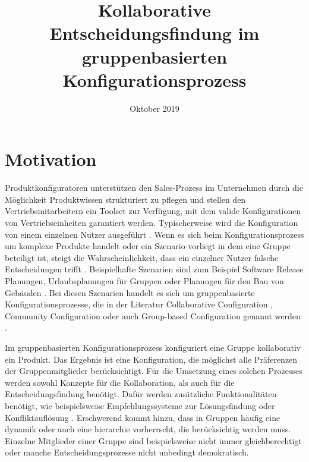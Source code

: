 \documentclass[12pt]{article}
\title{Kollaborative Entscheidungsfindung im gruppenbasierten Konfigurationsprozess}
\date{Oktober 2019}
\begin{document}
\maketitle

\section{Motivation}

Produktkonfiguratoren unterstützen den Sales-Prozess im Unternehmen durch die Möglichkeit Produktwissen strukturiert zu pflegen und stellen den Vertriebsmitarbeitern ein Toolset zur Verfügung, mit dem valide Konfigurationen von Vertriebseinheiten garantiert werden. Typischerweise wird die Konfiguration von einem einzelnen Nutzer ausgeführt \cite{felferningGroupBasedConfiguration2016, velasquez-guevaraMultiSPLOTSupportingMultiuser2018a}.
Wenn es sich beim Konfigurationsprozess um komplexe Produkte handelt oder ein Szenario vorliegt in dem eine Gruppe beteiligt ist, steigt die Wahrscheinlichkeit, dass ein einzelner Nutzer falsche Entscheidungen trifft \cite{felfernigGroupDecisionSupport2011}. 
Beispielhafte Szenarien sind zum Beispiel Software Release Planungen, Urlaubsplanungen für Gruppen oder Planungen für den Bau von Gebäuden \cite{felfernigOpenConfiguration2014}. 
Bei diesen Szenarien handelt es sich um gruppenbasierte Konfigurationsprozesse, die in der Literatur \glqq Collaborative Configuration \grqq, \glqq Community Configuration \grqq oder auch \glqq Group-based Configuration \grqq genannt werden \cite{felferningGroupBasedConfiguration2016, felfernigOpenConfiguration2014,mendoncaCollaborativeProductConfiguration2008,felfernigKnowledgebasedConfigurationResearch2014}.

Im gruppenbasierten Konfigurationsprozess konfiguriert eine Gruppe kollaborativ ein Produkt. Das Ergebnis ist eine Konfiguration, die möglichst alle Präferenzen der Gruppenmitglieder berücksichtigt. Für die Umsetzung eines solchen Prozesses werden sowohl Konzepte für die Kollaboration, als auch für die Entscheidungsfindung benötigt. Dafür werden zusätzliche Funktionalitäten benötigt, wie beispielsweise Empfehlungssysteme zur Lösungsfindung oder Konfliktauflösung \cite{felfernigKnowledgebasedConfigurationResearch2014}. 
Erschwerend kommt hinzu, dass in Gruppen häufig eine dynamik oder auch eine hierarchie vorherrscht, die berücksichtig werden muss. Einzelne Mitglieder einer Gruppe sind beispielsweise nicht immer gleichberechtigt oder manche Entscheidungsprozesse nicht unbedingt demokratisch.
\end{document}
